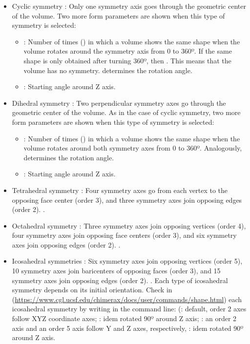 \begin{itemize}
\begin{itemize}
  \begin{itemize}
  \item Cyclic symmetry : Only one symmetry axis goes through the geometric center of the volume. Two more form parameters are shown when this type of symmetry is selected:
   \begin{itemize}
    \item {}: Number of times () in which a volume shows the same shape when the volume rotates around the symmetry axis from 0 to 360º. If the same shape is only obtained after turning 360º, then . This means that the volume has no symmetry.  determines the rotation angle. 
	\item {}: Starting angle around Z axis. 
   \end{itemize}
  \item Dihedral symmetry : Two perpendicular symmetry axes go through the geometric center of the volume. As in the case of cyclic symmetry, two more form parameters are shown when this type of symmetry is selected:
   \begin{itemize}
    \item {}: Number of times () in which a volume shows the same shape when the volume rotates around both symmetry axes from 0 to 360º. Analogously,  determines the rotation angle. 
	\item {}: Starting angle around Z axis. 
   \end{itemize}
  \item Tetrahedral symmetry : Four symmetry axes go from each vertex to the opposing face center (order 3), and three symmetry axes join opposing edges (order 2). .
  \item Octahedral symmetry : Three symmetry axes join opposing vertices (order 4), four symmetry axes join opposing face centers (order 3), and six symmetry axes join opposing edges (order 2). .
  \item Icosahedral symmetries : Six symmetry axes join opposing vertices (order 5), 10 symmetry axes join baricenters of opposing faces (order 3), and 15 symmetry axes join opposing edges (order 2). . Each type of icosahedral symmetry depends on its initial orientation. Check in \chimera (\url{https://www.cgl.ucsf.edu/chimerax/docs/user/commands/shape.html}) each icosahedral symmetry by writing in the command line:  (: default, order 2 axes follow XYZ coordinate axes; : idem rotated 90º around Z axis; : an order 2 axis and an order 5 axis follow Y and Z axes, respectively, : idem rotated 90º around Z axis.
  \end{itemize}
  

\end{itemize}
\end{itemize}
